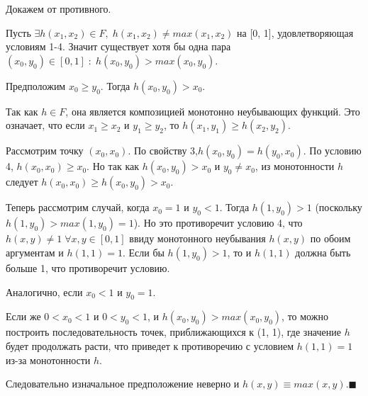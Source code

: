 Докажем от противного.

Пусть $\exists h(x_1, x_2) \in F, \; h(x_1, x_2) \neq max(x_1, x_2)$ на [0, 1], удовлетворяющая условиям 1-4.  Значит существует хотя бы одна пара $(x_0, y_0) \in [0, 1] \; : \; h(x_0, y_0)> max(x_0, y_0)$.

Предположим $x_0 \geq y_0$. Тогда $h(x_0, y_0) > x_0$.

Так как $h \in F$,  она является композицией монотонно неубывающих функций.  Это означает, что если $x_1 \geq x_2$ и $y_1 \geq y_2$, то $h(x_1, y_1) \geq h(x_2, y_2)$.

Рассмотрим точку $(x_0, x_0)$.  По свойству 3,$ h(x_0, y_0) = h(y_0, x_0)$.  По условию 4, $h(x_0, x_0) \geq x_0$.  Но так как $h(x_0, y_0) > x_0$ и $y_0 \neq x_0$,  из монотонности $h$ следует   $h(x_0, x_0) \geq h(x_0, y_0) > x_0$.

Теперь рассмотрим случай, когда $x_0 = 1$ и $y_0 < 1$.  Тогда $h(1, y_0) > 1$  (поскольку $h(1,y_0) > max(1, y_0) = 1$). Но это противоречит условию 4, что $h(x,y) \neq 1 \; \forall x, y \in [0, 1]$ ввиду монотонного неубывания $h(x,y)$ по обоим аргументам и $h(1,1) = 1$.  Если бы $h(1, y_0) > 1$, то и $h(1,1)$ должна быть больше 1, что противоречит условию.

Аналогично, если  $x_0 < 1$ и $y_0 = 1$.

Если же $0 < x_0 < 1$ и $0 < y_0 < 1$, и  $h(x_0, y_0) > max(x_0, y_0)$, то можно построить последовательность точек, приближающихся к (1, 1),  где значение $h$ будет продолжать расти, что приведет к противоречию с условием $h(1, 1) = 1$ из-за монотонности $h$.

Следовательно изначальное предположение неверно и $h(x,y)\equiv max(x,y).\blacksquare$

